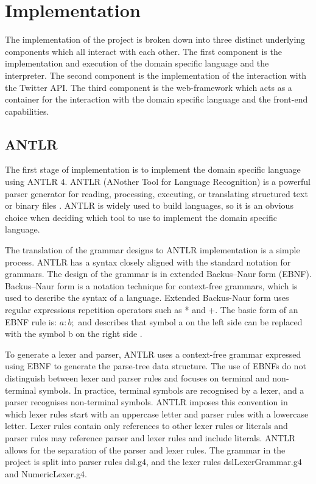 \chapter{Implementation}

The implementation of the project is broken down into three distinct underlying components which all interact with each other. The first component is the implementation and execution of the domain specific language and the interpreter. The second component is the implementation of the interaction with the Twitter API. The third component is the web-framework which acts as a container for the interaction with the domain specific language and the front-end capabilities.

\section{ANTLR}

The first stage of implementation is to implement the domain specific language using ANTLR 4. ANTLR (ANother Tool for Language Recognition) is a powerful parser generator for reading, processing, executing, or translating structured text or binary files \cite{antlr}. ANTLR is widely used to build languages, so it is an obvious choice when deciding which tool to use to implement the domain specific language. \newline \par

The translation of the grammar designs to ANTLR implementation is a simple process. ANTLR has a syntax closely aligned with the standard notation for grammars. The design of the grammar is in extended Backus–Naur form (EBNF). Backus–Naur form is a notation technique for context-free grammars, which is used to describe the syntax of a language. Extended Backus-Naur form uses regular expressions repetition operators such as * and +. The basic form of an EBNF rule is: $a : b;$ and describes that symbol a on the left side can be replaced with the symbol b on the right side \cite{standard1996ebnf}.\newline \par

To generate a lexer and parser, ANTLR uses a context-free grammar expressed using EBNF to generate the parse-tree data structure. The use of EBNFs do not distinguish between lexer and parser rules and focuses on terminal and non-terminal symbols. In practice, terminal symbols are recognised by a lexer, and a parser recognises non-terminal symbols. ANTLR imposes this convention in which lexer rules start with an uppercase letter and parser rules with a lowercase letter. Lexer rules contain only references to other lexer rules or literals and parser rules may reference parser and lexer rules and include literals. ANTLR allows for the separation of the parser and lexer rules. The grammar in the project is split into parser rules dsl.g4, and the lexer rules dslLexerGrammar.g4 and NumericLexer.g4. \newline \par

